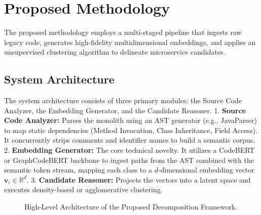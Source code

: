 \documentclass[12pt, a4paper]{article}
\begin{document}
\section{Proposed Methodology}

The proposed methodology employs a multi-staged pipeline that ingests raw legacy code, generates high-fidelity multidimensional embeddings, and applies an unsupervised clustering algorithm to delineate microservice candidates.

\subsection{System Architecture}
The system architecture consists of three primary modules: the Source Code Analyzer, the Embedding Generator, and the Candidate Reasoner.
1. \textbf{Source Code Analyzer:} Parses the monolith using an AST generator (e.g., JavaParser) to map static dependencies (Method Invocation, Class Inheritance, Field Access). It concurrently strips comments and identifier names to build a semantic corpus.
2. \textbf{Embedding Generator:} The core technical novelty. It utilizes a CodeBERT or GraphCodeBERT backbone to ingest paths from the AST combined with the semantic token stream, mapping each class to a $d$-dimensional embedding vector $\mathbf{v}_i \in \mathbb{R}^d$.
3. \textbf{Candidate Reasoner:} Projects the vectors into a latent space and executes density-based or agglomerative clustering.

\begin{figure}[htbp]
    \centering
    \caption{High-Level Architecture of the Proposed Decomposition Framework.}
    \label{fig:system_arch}
\end{figure}
\end{document}

